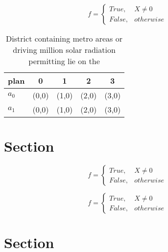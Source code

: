 \documentclass[a4paper]{article}
\begin{document}
\begin{equation}   f =
\begin{cases} True, & X \neq 0\\
False, & otherwise
\end{cases}
\end{equation}

\begin{table}
\begin{adjustbox}{width=0.5\columnwidth}
\begin{tabular}{|l|l|l|l|l|}
\hline
\textbf{plan} & \multicolumn{1}{c|}{\textbf{0}} & \multicolumn{1}{c|}{\textbf{1}} & \multicolumn{1}{c|}{\textbf{2}} & \multicolumn{1}{c|}{\textbf{3}} \\ \hline
\textbf{$a_0$}  & (0,0) & (1,0) & (2,0) & (3,0) \\ \hline
\textbf{$a_1$}  & (0,0) & (1,0) & (2,0) & (3,0) \\ \hline
\end{tabular}
\end{adjustbox}
\caption{District containing metro areas or driving million solar radiation permitting lie on the 
}
\end{table}

\section{Section}

\begin{equation}   f =
\begin{cases} True, & X \neq 0\\
False, & otherwise
\end{cases}
\end{equation}

\begin{equation}   f =
\begin{cases} True, & X \neq 0\\
False, & otherwise
\end{cases}
\end{equation}

\section{Section}
\end{document}
